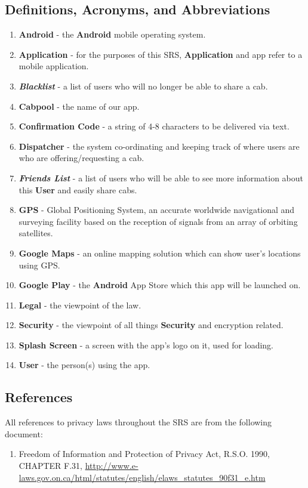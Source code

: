 \documentclass[english]{article}
\begin{document}
\subsection{Definitions, Acronyms, and Abbreviations}
\label{sub:definitions_acronyms_and_abbreviations}
\begin{enumerate}
	\item  \textbf{Android} - the  \textbf{Android} mobile operating system.
	\item \textbf{Application} - for the purposes of this SRS, \textbf{Application} and app refer to a mobile application.
	\item \textbf{\emph{Blacklist}} - a list of users who will no longer be able to share a cab.
	\item \textbf{Cabpool} - the name of our app.
	\item \textbf{Confirmation Code} - a string of 4-8 characters to be delivered via text.
	\item \textbf{Dispatcher} - the system co-ordinating and keeping track of where users are who are offering/requesting a cab.
	\item \textbf{\emph{Friends List}} - a list of users who will be able to see more information about this \textbf{User} and easily share cabs.
	\item \textbf{GPS} - Global Positioning System, an accurate worldwide navigational and surveying facility based on the reception of signals from an array of orbiting satellites.
	\item \textbf{Google Maps} - an online mapping solution which can show user's locations using GPS.
	\item \textbf{Google Play} - the  \textbf{Android} App Store which this app will be launched on.
	\item \textbf{Legal} - the viewpoint of the law.
	\item \textbf{Security} - the viewpoint of all things \textbf{Security} and encryption related.
	\item \textbf{Splash Screen} - a screen with the app's logo on it, used for loading.
	\item \textbf{User} - the person(s) using the app.
\end{enumerate}

\subsection{References}
\label{sub:references}
All references to privacy laws throughout the SRS are from the following document:
\begin{enumerate}
	\item Freedom of Information and Protection of Privacy Act, R.S.O. 1990, CHAPTER F.31, \url{http://www.e-laws.gov.on.ca/html/statutes/english/elaws_statutes_90f31_e.htm}
\end{enumerate}
\end{document}
